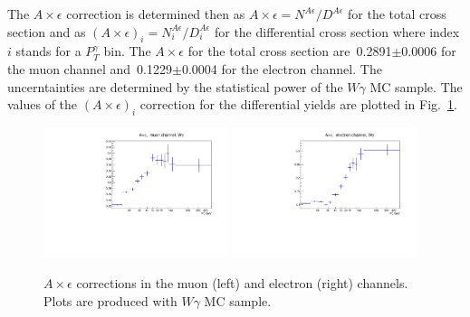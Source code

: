 The $A \times \epsilon$ correction is determined then as $A \times \epsilon = N^{A\epsilon}/D^{A\epsilon}$ for the total cross section and as $(A \times \epsilon)_i = N^{A\epsilon}_i/{D^{A\epsilon}_i}$ for the differential cross section where index $i$ stands for a $P_T^{\gamma}$ bin. The $A \times \epsilon$ for the total cross section are~0.2891$\pm$0.0006 for the muon channel and~0.1229$\pm$0.0004 for the electron channel. The uncerntainties are determined by the statistical power of the $W\gamma$ MC sample. The values of the $(A \times \epsilon)_i$ correction for the differential yields are plotted in Fig.~\ref{fig:accXeff_Wg}.

\begin{figure}[htb]
  \begin{center}
  \includegraphics[width=0.48\textwidth]{../figs/figs_v11/MUON_WGamma/Constants/C_accXeff_MUON_WGamma.pdf}  \includegraphics[width=0.48\textwidth]{../figs/figs_v11/ELECTRON_WGamma/Constants/C_accXeff_ELECTRON_WGamma.pdf}\\
  \label{fig:accXeff_Wg}
  \caption{$A\times\epsilon$ corrections in the muon (left) and electron (right) channels. Plots are produced with $W\gamma$ MC sample. }
  \end{center}
\end{figure}


